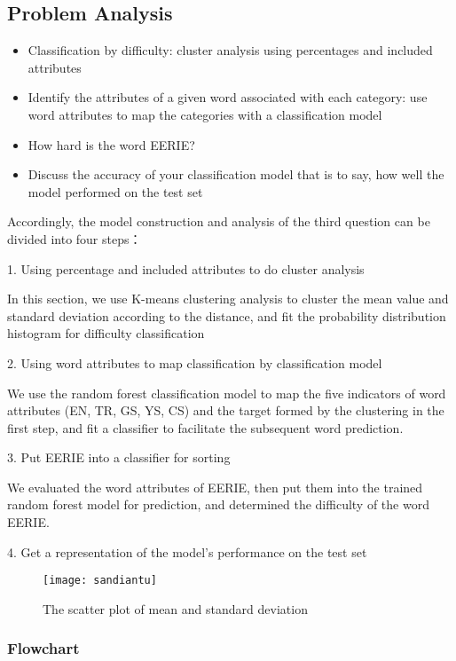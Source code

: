 \documentclass{mcmthesis}
\begin{document}
\subsection{Problem Analysis}
\begin{itemize}
\item Classification by difficulty: cluster analysis using percentages and included attributes
\item Identify the attributes of a given word associated with each category: use word 
attributes to map the categories with a classification model
\item How hard is the word EERIE?
\item Discuss the accuracy of your classification model that is to say, how well the model performed on the test set
\end{itemize}

Accordingly, the model construction and analysis of the third question can be divided into
four steps：

1. Using percentage and included attributes to do cluster analysis

In this section, we use K-means clustering analysis to cluster the mean value and
standard deviation according to the distance, and fit the probability distribution
histogram for difficulty classification

2. Using word attributes to map classification by classification model

We use the random forest classification model to map the five indicators of word
attributes (EN, TR, GS, YS, CS) and the target formed by the clustering in the first
step, and fit a classifier to facilitate the subsequent word prediction.

3. Put EERIE into a classifier for sorting

We evaluated the word attributes of EERIE, then put them into the trained random
forest model for prediction, and determined the difficulty of the word EERIE.

4. Get a representation of the model's performance on the test set

\begin{figure}[h]
\small
\centering
\texttt{[image: sandiantu]}
\caption{The scatter plot of mean and standard deviation} \label{fig:aa}
\end{figure}

\subsubsection{Flowchart}
\end{document}

